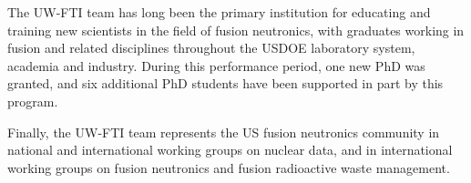 The \gls{UW-FTI} team has long been the primary institution for educating and
training new scientists in the field of fusion neutronics, with graduates
working in fusion and related disciplines throughout the \gls{USDOE} laboratory
system, academia and industry.  During this performance period, one new PhD
was granted, and six additional PhD students have been supported in part by
this program.

Finally, the \gls{UW-FTI} team represents the US fusion neutronics community
in national and international working groups on nuclear data, and in
international working groups on fusion neutronics and fusion radioactive waste
management.

